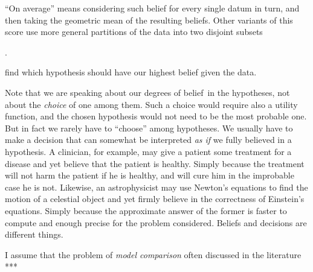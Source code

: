 \documentclass[\ifafour a4paper,12pt,\else a5paper,10pt,\fi%
onecolumn,oneside,article,%
british%
]{memoir}
\theoremstyle{remark}
\theoremstyle{innote}
\newcommand*{\defd}{\coloneqq}
\DeclarePairedDelimiter\set{\{}{\}}
\newcommand*{\p}{\mathrm{P}}%
\renewcommand*{\|}[1][]{\nonscript\,#1\vert\nonscript\;\mathopen{}}
\newcommand*{\prop}[1]{\text{\textquoteleft}#1\text{\textquoteright}}
\newcommand*{\dobs}{degrees of belief}
\newcommand*{\yK}{I}
\newcommand*{\eq}{\mathrel{\!=\!}}
\begin{document}








\enquote{On average} means considering such belief for every single datum
in turn, and then taking the geometric mean of the resulting
beliefs. %
Other variants of this score use more general partitions of the data into
two disjoint subsets\addtocounter{footnote}{-1}\footnotemark{}.



find which hypothesis should have our highest belief
given the data.


Note that we are speaking about our \dobs\ in the hypotheses, not about the
\emph{choice} of one among them. Such a choice would require also a utility
function, and the chosen hypothesis would not need to be the most probable
one. But in fact we rarely have to \enquote{choose} among hypotheses. We
usually have to make a decision that can somewhat be interpreted \emph{as
  if} we fully believed in a hypothesis. A clinician, for example, may give
a patient some treatment for a disease and yet believe that the patient is
healthy. Simply because the treatment will not harm the patient if he is
healthy, and will cure him in the improbable case he is not. Likewise, an
astrophysicist may use Newton's equations to find the motion of a celestial
object and yet firmly believe in the correctness of Einstein's equations.
Simply because the approximate answer of the former is faster to compute
and enough precise for the problem considered. Beliefs and decisions are
different things.

I assume that the problem of \emph{model comparison} often discussed in the
literature ***
\end{document}
